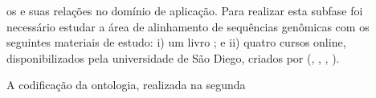 \usepackage{pdfpages}     		%
\usepackage{algorithm}			%
\usepackage{mdwlist}			%
\usepackage[noend]{algpseudocode}			%
\usepackage{lipsum}				%
\usepackage{subcaption}
\usepackage{amsmath}
\usepackage{epstopdf}
\usepackage{array}
\usepackage{graphicx}
\usepackage{multirow}
\usepackage{amstext}
\usepackage{longtable, tabu}
\usepackage[dvipsnames]{xcolor}
\usepackage{amsfonts}
\usepackage{bm}
os e suas relações no domínio de aplicação. Para realizar esta subfase foi necessário estudar a área de alinhamento de sequências genômicas com os seguintes materiais de estudo: i) um livro \cite{Setubal97}; e ii) quatro cursos online, disponibilizados pela universidade de São Diego, criados por  (\citeyear{Pevzner2015b}, \citeyear{Pevzner2015a}, \citeyear{Pevzner2015c}, \citeyear{Pevzner2015d}). 

A codificação da ontologia, realizada na segunda\usepackage[utf8]{inputenc}		%
\usepackage{lastpage}			%
\usepackage{indentfirst}		%
\usepackage{color}				%
\usepackage{graphicx}			%

\usepackage{microtype} 			%

